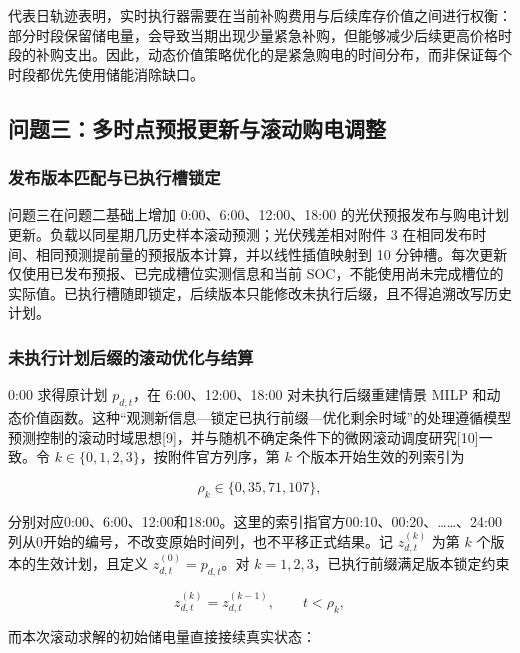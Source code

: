 \documentclass[zihao=-4,a4paper,UTF8,fontset=none]{ctexart}
\begin{document}
代表日轨迹表明，实时执行器需要在当前补购费用与后续库存价值之间进行权衡：部分时段保留储电量，会导致当期出现少量紧急补购，但能够减少后续更高价格时段的补购支出。因此，动态价值策略优化的是紧急购电的时间分布，而非保证每个时段都优先使用储能消除缺口。

\subsection{问题三：多时点预报更新与滚动购电调整}\label{ux95eeux9898ux4e09ux591aux65f6ux70b9ux9884ux62a5ux66f4ux65b0ux4e0eux6edaux52a8ux8d2dux7535ux8c03ux6574}

\subsubsection{发布版本匹配与已执行槽锁定}\label{ux53d1ux5e03ux7248ux672cux5339ux914dux4e0eux5df2ux6267ux884cux69fdux9501ux5b9a}

问题三在问题二基础上增加 0:00、6:00、12:00、18:00 的光伏预报发布与购电计划更新。负载以同星期几历史样本滚动预测；光伏残差相对附件 3 在相同发布时间、相同预测提前量的预报版本计算，并以线性插值映射到 10 分钟槽。每次更新仅使用已发布预报、已完成槽位实测信息和当前 SOC，不能使用尚未完成槽位的实际值。已执行槽随即锁定，后续版本只能修改未执行后缀，且不得追溯改写历史计划。

\subsubsection{未执行计划后缀的滚动优化与结算}\label{ux672aux6267ux884cux8ba1ux5212ux540eux7f00ux7684ux6edaux52a8ux4f18ux5316ux4e0eux7ed3ux7b97}

0:00 求得原计划 \(p_{d,t}\)，在 6:00、12:00、18:00 对未执行后缀重建情景 MILP 和动态价值函数。这种``观测新信息---锁定已执行前缀---优化剩余时域''的处理遵循模型预测控制的滚动时域思想{[}9{]}，并与随机不确定条件下的微网滚动调度研究{[}10{]}一致。令 \(k\in\{0,1,2,3\}\)，按附件官方列序，第 \(k\) 个版本开始生效的列索引为

\[
\rho_k\in\{0,35,71,107\},
\tag{8a}
\]

分别对应0:00、6:00、12:00和18:00。这里的索引指官方00:10、00:20、\ldots\ldots、24:00列从0开始的编号，不改变原始时间列，也不平移正式结果。记 \(z_{d,t}^{(k)}\) 为第 \(k\) 个版本的生效计划，且定义 \(z_{d,t}^{(0)}=p_{d,t}\)。对 \(k=1,2,3\)，已执行前缀满足版本锁定约束

\[
z_{d,t}^{(k)}=z_{d,t}^{(k-1)},\qquad t<\rho_k,
\tag{8b}
\]

而本次滚动求解的初始储电量直接接续真实状态：
\end{document}
